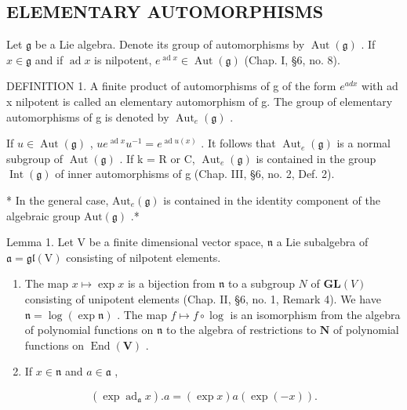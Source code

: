 \subsection{ELEMENTARY AUTOMORPHISMS}

Let \(\mathfrak{g}\) be a Lie algebra. Denote its group of automorphisms by \(\operatorname{Aut}(\mathfrak{g})\) . If \(x \in \mathfrak{g}\) and if \(\operatorname{ad} x\) is nilpotent, \(e^{\operatorname{ad} x} \in \operatorname{Aut}(\mathfrak{g})\) (Chap. I, §6, no. 8).

DEFINITION 1. A finite product of automorphisms of g of the form \(e^{ad x}\) with ad x nilpotent is called an elementary automorphism of g. The group of elementary automorphisms of g is denoted by \(\operatorname{Aut}_{e}(\mathfrak{g})\) .

If \(u \in \operatorname{Aut}(\mathfrak{g})\) , \(ue^{\operatorname{ad}x}u^{-1} = e^{\operatorname{ad}u(x)}\) . It follows that \(\operatorname{Aut}_{e}(\mathfrak{g})\) is a normal subgroup of \(\operatorname{Aut}(\mathfrak{g})\) . If k = R or C, \(\operatorname{Aut}_{e}(\mathfrak{g})\) is contained in the group \(\operatorname{Int}(\mathfrak{g})\) of inner automorphisms of g (Chap. III, §6, no. 2, Def. 2).

* In the general case, \(\mathrm{Aut}_e(\mathfrak{g})\) is contained in the identity component of the algebraic group \(\mathrm{Aut}(\mathfrak{g})\) .*

Lemma 1. Let \(\mathrm{V}\) be a finite dimensional vector space, \(\mathfrak{n}\) a Lie subalgebra of \(\mathfrak{a} = \mathfrak{gl}(\mathrm{V})\) consisting of nilpotent elements.

\begin{enumerate}
\def\labelenumi{(\roman{enumi})}
\item
  The map \(x \mapsto \exp x\) is a bijection from \(\mathfrak{n}\) to a subgroup \(N\) of \(\mathbf{GL}(V)\) consisting of unipotent elements (Chap. II, §6, no. 1, Remark 4). We have \(\mathfrak{n} = \log(\exp \mathfrak{n})\) . The map \(f \mapsto f \circ \log\) is an isomorphism from the algebra of polynomial functions on \(\mathfrak{n}\) to the algebra of restrictions to \(\mathbf{N}\) of polynomial functions on \(\operatorname{End}(\mathbf{V})\) .
\item
  If \(x \in \mathfrak{n}\) and \(a \in \mathfrak{a}\) ,
\end{enumerate}

\[
(\exp \operatorname{ad} _ {\mathfrak {a}} x). a = (\exp x) a (\exp (- x)).
\]

